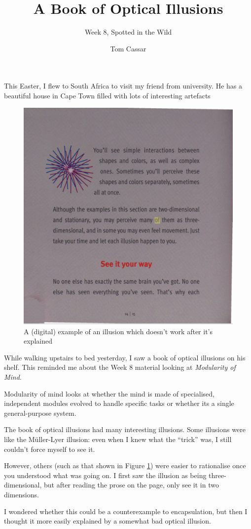 \documentclass[fontsize=12]{article}
\title{A Book of Optical Illusions}
\author{Week 8, Spotted in the Wild}
\date{Tom Cassar}
\begin{document}
\maketitle

This Easter, I flew to South Africa to visit my friend from university. He has a
beautiful house in Cape Town filled with lots of interesting artefacts

\begin{figure}[H]
    \centering
    \includegraphics[width=0.6 \linewidth]{./img/bad-illusion.png} 
    \caption{A (digital) example of an illusion which doesn't work after it's
    explained}\label{fig:illusion}
\end{figure}

While walking upstairs to bed yesterday, I saw a book of optical illusions
\cite{bach2006optical} on
his shelf. This reminded me about the Week 8 material looking at
\textit{Modularity of Mind}.


Modularity of mind looks at whether the mind is made of specialised, independent
modules evolved to handle specific tasks or whether its a single general-purpose
system.

The book of optical illusions had many interesting illusions. Some illusions
were like the M\"{u}ller-Lyer illusion: even when I knew what the ``trick'' was,
I still couldn't force myself to see it. 

However, others (such as that shown in Figure \ref{fig:illusion}) were easier to
rationalise once you understood what was going on. I first saw the illusion as
being three-dimensional, but after reading the prose on the page, only see it in
two dimensions.

I wondered whether this could be a counterexample to encapsulation, but then I
thought it more easily explained by a somewhat bad optical illusion.



\end{document}
